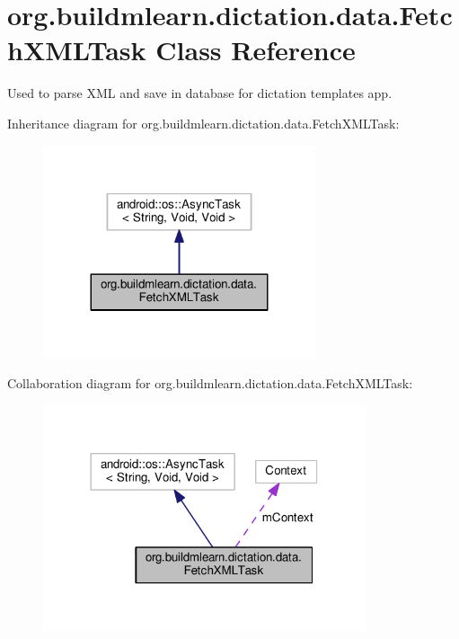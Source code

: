 \hypertarget{classorg_1_1buildmlearn_1_1dictation_1_1data_1_1FetchXMLTask}{}\section{org.\+buildmlearn.\+dictation.\+data.\+Fetch\+X\+M\+L\+Task Class Reference}
\label{classorg_1_1buildmlearn_1_1dictation_1_1data_1_1FetchXMLTask}


Used to parse X\+ML and save in database for dictation template\textquotesingle{}s app.  




Inheritance diagram for org.\+buildmlearn.\+dictation.\+data.\+Fetch\+X\+M\+L\+Task\+:
\nopagebreak
\begin{figure}[H]
\begin{center}
\leavevmode
\includegraphics[width=227pt]{classorg_1_1buildmlearn_1_1dictation_1_1data_1_1FetchXMLTask__inherit__graph}
\end{center}
\end{figure}


Collaboration diagram for org.\+buildmlearn.\+dictation.\+data.\+Fetch\+X\+M\+L\+Task\+:
\nopagebreak
\begin{figure}[H]
\begin{center}
\leavevmode
\includegraphics[width=269pt]{classorg_1_1buildmlearn_1_1dictation_1_1data_1_1FetchXMLTask__coll__graph}
\end{center}
\end{figure}

